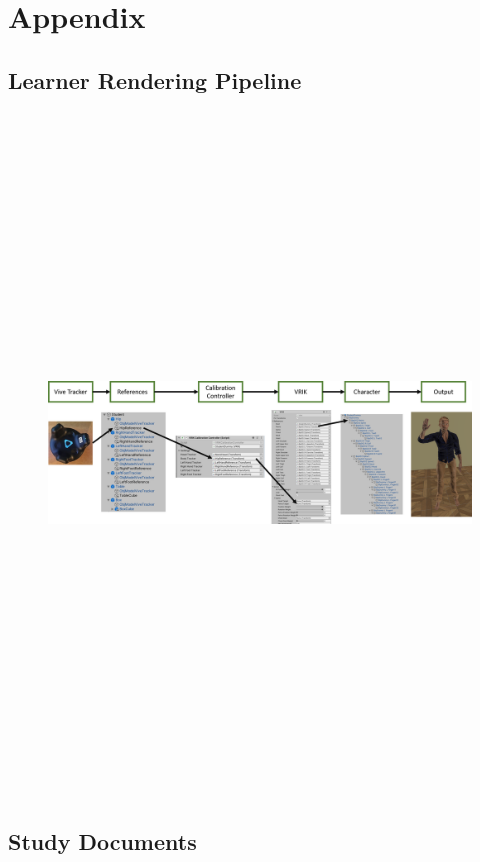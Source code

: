 \chapter{Appendix}

\section{Learner Rendering Pipeline}
\label{a:studentRenderingPipeline}
\begin{figure}[H]
	\includegraphics[angle=90,height=18cm]{figures/studentRenderingPipeline.png}
\end{figure}
\newpage

\section{Study Documents}


